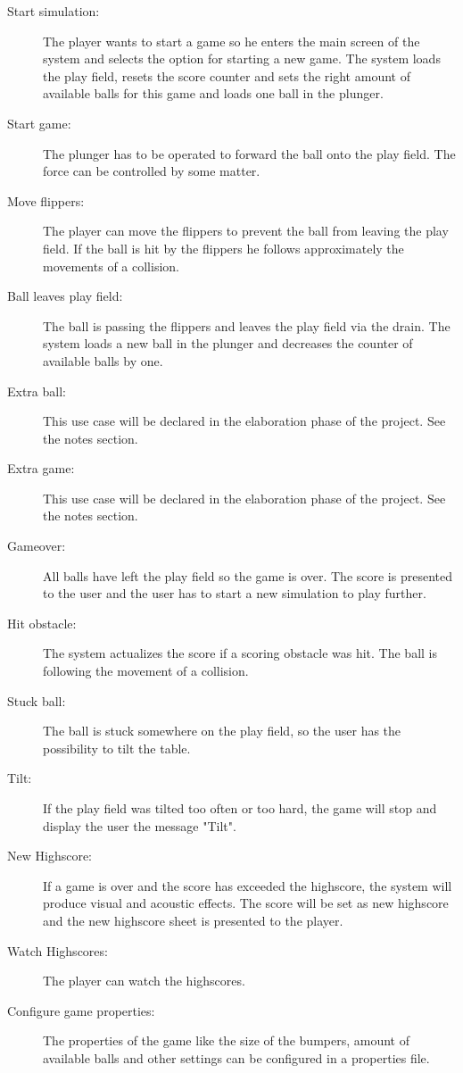 \documentclass[fontsize=12pt,
               paper=a4,
               twoside=false,
               parskip=half,
               ]{scrartcl}
\begin{document}
\begin{description}

\item[Start simulation:]   The player wants to start a game so he enters the main screen of the system and selects the option for starting a new game. The system loads the play field, resets the score counter and sets the right amount of available balls for this game and loads one ball in the plunger.

\item[Start game:] The plunger has to be operated to forward the ball onto the play field.  The force can be controlled by some matter.

\item[Move flippers:] The player can move the flippers to prevent the ball from leaving the play field. If the ball is hit by the flippers he follows approximately the movements of a collision.

\item[Ball leaves play field:] The ball is passing the flippers and leaves the play field via the drain. The system loads a new ball in the plunger and decreases the counter of available balls by one.

\item[Extra ball:] This use case will be declared in the elaboration phase of the project. See the notes section.

\item[Extra game:] This use case will be declared in the elaboration phase of the project. See the notes section.

\item[Gameover:] All balls have left the play field so the game is over. The score is presented to the user and the user has to start a new simulation to play further.

\item[Hit obstacle:] The system actualizes the score if a scoring obstacle  was hit. The ball is following the movement of a collision.

\item[Stuck ball:] The ball is stuck somewhere on the play field, so the user has the possibility to tilt the table.

\item[Tilt:] If the play field was tilted too often or too hard, the game will stop and display the user the message "Tilt".

\item[New Highscore:] If a game is over and the score has exceeded the highscore, the system will produce visual and acoustic effects. The score will be set as new highscore and the new highscore sheet is presented to the player.

\item[Watch Highscores:] The player can watch the highscores. 

\item[Configure game properties:] The properties of the game like the size of the bumpers, amount of available balls and other settings can be configured in a properties file.

\end{description}
\end{document}
